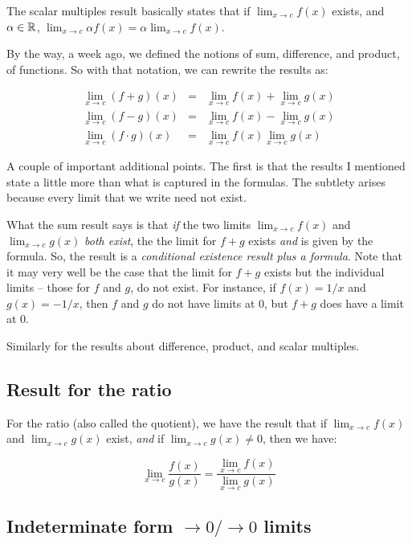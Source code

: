 \documentclass[10pt]{amsart}
\begin{document}
The scalar multiples result basically states that if $\lim_{x \to c}
f(x)$ exists, and $\alpha \in \mathbb{R}$, $\lim_{x \to c} \alpha f(x) =
\alpha \lim_{x \to c} f(x)$.

By the way, a week ago, we defined the notions of sum, difference, and
product, of functions. So with that notation, we can rewrite the
results as:

\begin{eqnarray*}
  \lim_{x \to c} (f + g)(x) & = & \lim_{x \to c} f(x) + \lim_{x \to c} g(x) \\
  \lim_{x \to c} (f - g)(x) & = & \lim_{x \to c} f(x) - \lim_{x \to c} g(x) \\
  \lim_{x \to c} (f \cdot g)(x) & = & \lim_{x \to c} f(x) \lim_{x \to c} g(x)
\end{eqnarray*}

A couple of important additional points. The first is that the
results I mentioned state a little more than what is captured in the
formulas. The subtlety arises because every limit that we write need not
exist.

What the sum result says is that {\em if} the two limits $\lim_{x \to
c} f(x)$ and $\lim_{x \to c} g(x)$ {\em both exist}, the the limit for
$f + g$ exists {\em and} is given by the formula. So, the result is a
{\em conditional existence result plus a formula}. Note that it may
very well be the case that the limit for $f + g$ exists but the
individual limits -- those for $f$ and $g$, do not exist. For
instance, if $f(x) = 1/x$ and $g(x) = -1/x$, then $f$ and $g$ do not
have limits at $0$, but $f + g$ does have a limit at $0$.

Similarly for the results about difference, product, and scalar
multiples.

\subsection{Result for the ratio}

For the ratio (also called the quotient), we have the result that if
$\lim_{x \to c} f(x)$ and $\lim_{x \to c} g(x)$ exist, {\em and} if
$\lim_{x \to c}g(x) \ne 0$, then we have:

\begin{equation*}
  \lim_{x \to c} \frac{f(x)}{g(x)} = \frac{\lim_{x \to c} f(x)}{\lim_{x \to c} g(x)}
\end{equation*}

\subsection{Indeterminate form $\to 0/\to 0$ limits}
\end{document}
